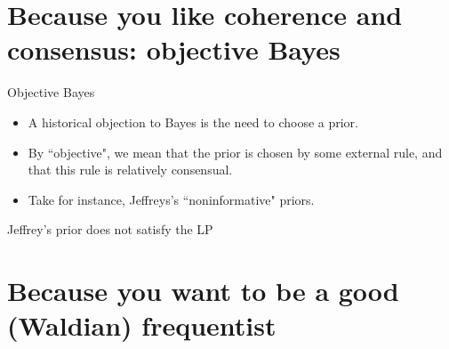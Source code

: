 \documentclass[10pt]{beamer}
\begin{document}

\section{Because you like coherence and consensus: objective Bayes}
\begin{frame}{Objective Bayes}
\begin{itemize}
\item A historical objection to Bayes is the need to choose a prior.
\item By ``objective", we mean that the prior is chosen by some external rule, and that this rule is relatively consensual.
\item Take for instance, Jeffreys's ``noninformative" priors.
\blank
\end{itemize}
\end{frame}
\begin{frame}{Jeffrey's prior does not satisfy the LP}
\end{frame}

\section{Because you want to be a good (Waldian) frequentist}
\end{document}

